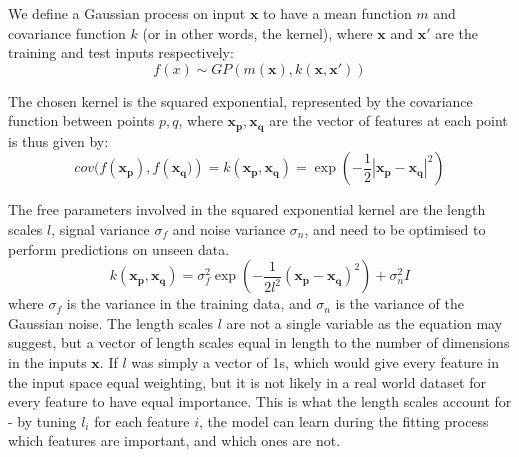We define a Gaussian process on input $\mathbf{x}$ to have a mean function $m$ and covariance function $k$ (or in other words, the kernel), where $\mathbf{x}$ and $\mathbf{x'}$ are the training and test inputs respectively:
\begin{equation}
f(x) \sim GP(m(\mathbf{x}), k(\mathbf{x}, \mathbf{x'}))
\end{equation}

The chosen kernel is the squared exponential, represented by the covariance function between points $p, q$, where $\mathbf{x_p, x_q}$ are the vector of features at each point is thus given by:
\begin{equation}\label{eq:simplegpcov}
    cov(f(\mathbf{x_p}), f(\mathbf{x_q)}) = k(\mathbf{x_p, x_q}) = \exp(-\frac{1}{2}|\mathbf{x_p}-\mathbf{x_q}|^2)
\end{equation}

The free parameters involved in the squared exponential kernel are the length scales $l$, signal variance $\sigma_f$ and noise variance $\sigma_n$, and need to be optimised to perform predictions on unseen data.
\begin{equation}\label{eq:fullgpcov}
    k\mathbf{(x_p, x_q)} = \sigma^2_f \exp(-\frac{1}{2l^2} (\mathbf{x_p-x_q})^2) + \sigma^2_nI
\end{equation}
where $\sigma_f$ is the variance in the training data, and $\sigma_n$ is the variance of the Gaussian noise. The length scales $l$ are not a single variable as the equation may suggest, but a vector of length scales equal in length to the number of dimensions in the inputs $\mathbf{x}$. If $l$ was simply a vector of 1s, which would give every feature in the input space equal weighting, but it is not likely in a real world dataset for every feature to have equal importance. This is what the length scales account for - by tuning $l_i$ for each feature $i$, the model can learn during the fitting process which features are important, and which ones are not. 


